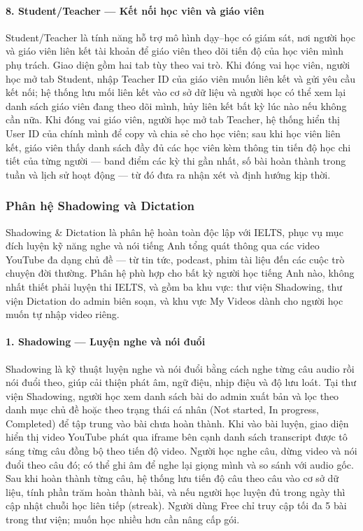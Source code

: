 \paragraph{8. Student/Teacher --- Kết nối học viên và giáo viên}

Student/Teacher là tính năng hỗ trợ mô hình dạy--học có giám sát, nơi người học và giáo viên liên kết tài khoản để giáo viên theo dõi tiến độ của học viên mình phụ trách. Giao diện gồm hai tab tùy theo vai trò. Khi đóng vai học viên, người học mở tab Student, nhập Teacher ID của giáo viên muốn liên kết và gửi yêu cầu kết nối; hệ thống lưu mối liên kết vào cơ sở dữ liệu và người học có thể xem lại danh sách giáo viên đang theo dõi mình, hủy liên kết bất kỳ lúc nào nếu không cần nữa. Khi đóng vai giáo viên, người học mở tab Teacher, hệ thống hiển thị User ID của chính mình để copy và chia sẻ cho học viên; sau khi học viên liên kết, giáo viên thấy danh sách đầy đủ các học viên kèm thông tin tiến độ học chi tiết của từng người --- band điểm các kỳ thi gần nhất, số bài hoàn thành trong tuần và lịch sử hoạt động --- từ đó đưa ra nhận xét và định hướng kịp thời.

\subsubsection{Phân hệ Shadowing và Dictation}

Shadowing \& Dictation là phân hệ hoàn toàn độc lập với IELTS, phục vụ mục đích luyện kỹ năng nghe và nói tiếng Anh tổng quát thông qua các video YouTube đa dạng chủ đề --- từ tin tức, podcast, phim tài liệu đến các cuộc trò chuyện đời thường. Phân hệ phù hợp cho bất kỳ người học tiếng Anh nào, không nhất thiết phải luyện thi IELTS, và gồm ba khu vực: thư viện Shadowing, thư viện Dictation do admin biên soạn, và khu vực My Videos dành cho người học muốn tự nhập video riêng.

\paragraph{1. Shadowing --- Luyện nghe và nói đuổi}

Shadowing là kỹ thuật luyện nghe và nói đuổi bằng cách nghe từng câu audio rồi nói đuổi theo, giúp cải thiện phát âm, ngữ điệu, nhịp điệu và độ lưu loát. Tại thư viện Shadowing, người học xem danh sách bài do admin xuất bản và lọc theo danh mục chủ đề hoặc theo trạng thái cá nhân (Not started, In progress, Completed) để tập trung vào bài chưa hoàn thành. Khi vào bài luyện, giao diện hiển thị video YouTube phát qua iframe bên cạnh danh sách transcript được tô sáng từng câu đồng bộ theo tiến độ video. Người học nghe câu, dừng video và nói đuổi theo câu đó; có thể ghi âm để nghe lại giọng mình và so sánh với audio gốc. Sau khi hoàn thành từng câu, hệ thống lưu tiến độ câu theo câu vào cơ sở dữ liệu, tính phần trăm hoàn thành bài, và nếu người học luyện đủ trong ngày thì cập nhật chuỗi học liên tiếp (streak). Người dùng Free chỉ truy cập tối đa 5 bài trong thư viện; muốn học nhiều hơn cần nâng cấp gói.

